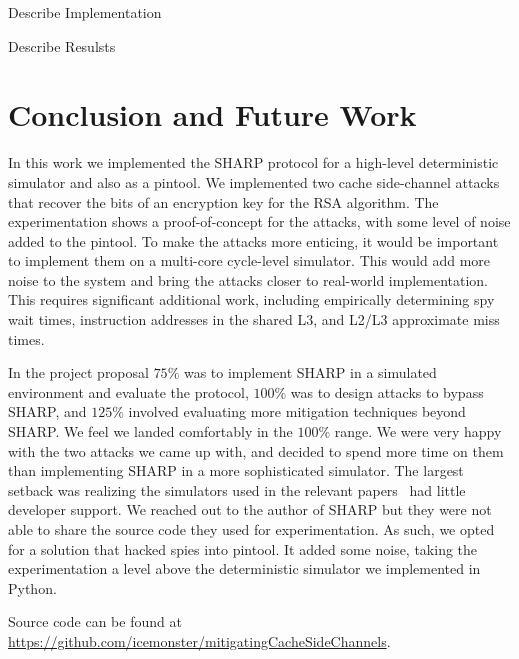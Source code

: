 \documentclass[12pt]{article}
\begin{document}
Describe Implementation 

Describe Resulsts

\section{Conclusion and Future Work}

In this work we implemented the SHARP protocol for a high-level deterministic simulator and also as a pintool.
We implemented two cache side-channel attacks that recover the bits of an encryption key for the RSA algorithm.
The experimentation shows a proof-of-concept for the attacks, with some level of noise added to the pintool.
To make the attacks more enticing, it would be important to implement them on a multi-core cycle-level simulator.
This would add more noise to the system and bring the attacks closer to real-world implementation.
This requires significant additional work, including empirically determining spy wait times, instruction addresses in the shared L3, and L2/L3 approximate miss times.

In the project proposal $75\%$ was to implement SHARP in a simulated environment and evaluate the protocol, $100\%$ was to design attacks to bypass SHARP, and $125\%$ involved evaluating more mitigation techniques beyond SHARP. 
We feel we landed comfortably in the $100\%$ range.
We were very happy with the two attacks we came up with, and decided to spend more time on them than implementing SHARP in a more sophisticated simulator.
The largest setback was realizing the simulators used in the relevant papers~\cite{sharp,howSharp} had little developer support.
We reached out to the author of SHARP but they were not able to share the source code they used for experimentation.
As such, we opted for a solution that hacked spies into pintool.
It added some noise, taking the experimentation a level above the deterministic simulator we implemented in Python.

Source code can be found at\\ \url{https://github.com/icemonster/mitigatingCacheSideChannels}.


\newpage



\end{document}
